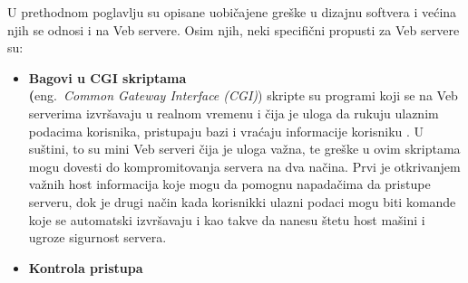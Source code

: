 \documentclass[a4paper]{article}
\begin{document}
\indent U prethodnom poglavlju su opisane uobičajene greške u dizajnu softvera i većina njih se odnosi i na Veb servere. Osim njih, neki specifični propusti za Veb servere su:  
\begin{itemize}
    \item \textbf{Bagovi u CGI skriptama }\\
    \textbf({eng.~{\em  Common Gateway Interface (CGI)}}) skripte su programi koji se na Veb serverima izvršavaju u realnom vremenu i čija je uloga da rukuju ulaznim podacima korisnika, pristupaju bazi i vraćaju informacije korisniku \cite{lawsa}. U suštini, to su mini Veb serveri čija je uloga važna, te greške u ovim skriptama mogu dovesti do kompromitovanja servera na dva načina. Prvi je otkrivanjem važnih host informacija koje mogu da pomognu napadačima da pristupe serveru, dok je drugi način kada korisnikki ulazni podaci mogu biti komande koje se automatski izvršavaju i kao takve da nanesu štetu host mašini i ugroze sigurnost servera.
    
    
     \item \textbf{ Kontrola pristupa }  
     

\end{itemize}
\end{document}
